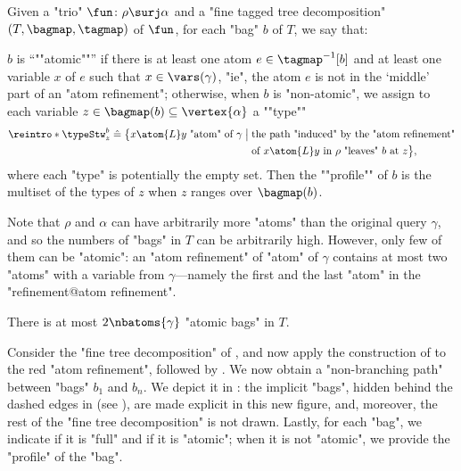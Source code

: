 \begin{definition}
    \AP Given a "trio" $\fun\colon \rho \surj \alpha$ and a "fine tagged tree decomposition"
    $(T, \bagmap, \tagmap)$ of $\fun$, for each "bag" $b$ of $T$, we say that:
    \begin{itemize}
        \itemAP $b$ is ``""atomic""'' if there is at least one atom $e \in \tagmap^{-1}[b]$ 
            and at least one variable $x$ of $e$ such that $x \in \vars(\gamma)$, "ie", the atom $e$ is not in the `middle' part of an "atom refinement";
        \itemAP otherwise, when $b$ is "non-atomic", we assign to each variable
            $z \in \bagmap(b) \subseteq \vertex{\alpha}$ a ""type""
            \begin{align*}
                \reintro*\typeStw_z^b \defeq
                \bigl\{ x \atom{L} y \text{ "atom" of $\gamma$} \;\big\vert\; {} &
                    \text{the path "induced" by the "atom refinement"} \\
                    &\text{of $x \atom{L} y$ in $\rho$ "leaves" $b$ at $z$}
                \bigr\},
            \end{align*}
			where each "type" is potentially the empty set.
            Then the ""profile"" of $b$ is the multiset of the types of $z$
            when $z$ ranges over $\bagmap(b)$.
    \end{itemize}
\end{definition}

Note that $\rho$ and $\alpha$ can have arbitrarily more "atoms" than the original query
$\gamma$, and so the numbers of "bags" in $T$ can be arbitrarily high. However,
only few of them can be "atomic": an "atom refinement" of "atom" of $\gamma$
contains at most two "atoms" with a variable from $\gamma$---namely the
first and the last "atom" in the "refinement@atom refinement".
\begin{fact}
	\AP\label{fact:bound-atomic-bags}
	There is at most $2 \nbatoms{\gamma}$ "atomic bags" in $T$.
\end{fact}


Consider the "fine tree decomposition" of , and now apply the construction of  to the red "atom refinement", followed by . We now obtain a "non-branching path"
between "bags" $b_1$ and $b_n$. We depict it in :
the implicit "bags", hidden behind the dashed edges in  (see ), are made explicit in this new figure, and, moreover, the rest of the "fine tree decomposition" is not drawn.
Lastly, for each "bag", we indicate if it is "full" and if it is "atomic"; when it is not "atomic", 
we provide the "profile" of the "bag".

